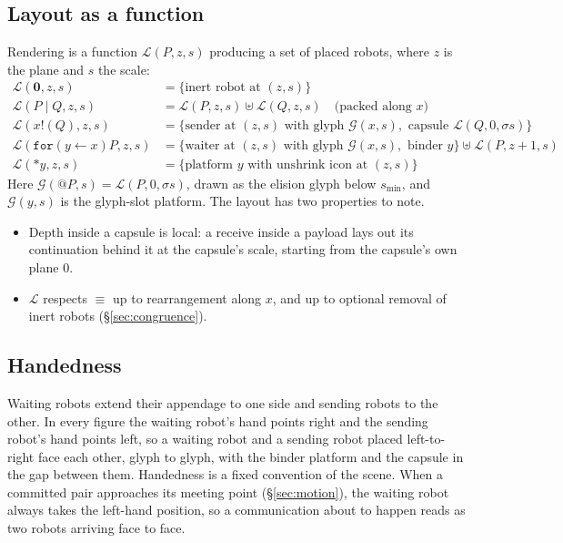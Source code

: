 \documentclass[11pt]{article}
\makeatletter
\newcommand{\rhonil}{\mathbf{0}}
\newcommand{\recv}[3]{\mathtt{for}(#1 \leftarrow #2)#3}
\newcommand{\send}[2]{#1!(#2)}
\newcommand{\quot}[1]{@#1}
\newcommand{\drop}[1]{{*}#1}
\makeatother
\begin{document}
\subsection{Layout as a function}
Rendering is a function $\mathcal{L}(P, z, s)$ producing a set of placed robots, where $z$ is
the plane and $s$ the scale:
\begin{align*}
\mathcal{L}(\rhonil, z, s) &= \{\text{inert robot at } (z,s)\}\\
\mathcal{L}(P \mid Q, z, s) &= \mathcal{L}(P,z,s) \uplus \mathcal{L}(Q,z,s)
  \quad\text{(packed along } x\text{)}\\
\mathcal{L}(\send{x}{Q}, z, s) &= \{\text{sender at } (z,s) \text{ with glyph } \mathcal{G}(x,s),
  \text{ capsule } \mathcal{L}(Q, 0, \sigma s)\}\\
\mathcal{L}(\recv{y}{x}{P}, z, s) &= \{\text{waiter at } (z,s) \text{ with glyph } \mathcal{G}(x,s),
  \text{ binder } y\} \uplus \mathcal{L}(P, z{+}1, s)\\
\mathcal{L}(\drop{y}, z, s) &= \{\text{platform } y \text{ with unshrink icon at } (z,s)\}
\end{align*}
Here $\mathcal{G}(\quot{P}, s) = \mathcal{L}(P, 0, \sigma s)$, drawn as the elision glyph
below $s_{\min}$, and $\mathcal{G}(y,s)$ is the glyph-slot platform. The layout has two
properties to note.
\begin{itemize}
  \item Depth inside a capsule is local: a receive inside a payload lays out its continuation
    behind it at the capsule's scale, starting from the capsule's own plane $0$.
  \item $\mathcal{L}$ respects $\equiv$ up to rearrangement along $x$, and up to optional
    removal of inert robots (\S\ref{sec:congruence}).
\end{itemize}

\subsection{Handedness}
Waiting robots extend their appendage to one side and sending robots to the other. In every
figure the waiting robot's hand points right and the sending robot's hand points left, so a
waiting robot and a sending robot placed left-to-right face each other, glyph to glyph, with
the binder platform and the capsule in the gap between them. Handedness is a fixed convention
of the scene. When a committed pair approaches its meeting point (\S\ref{sec:motion}), the
waiting robot always takes the left-hand position, so a communication about to happen reads as
two robots arriving face to face.
\end{document}
